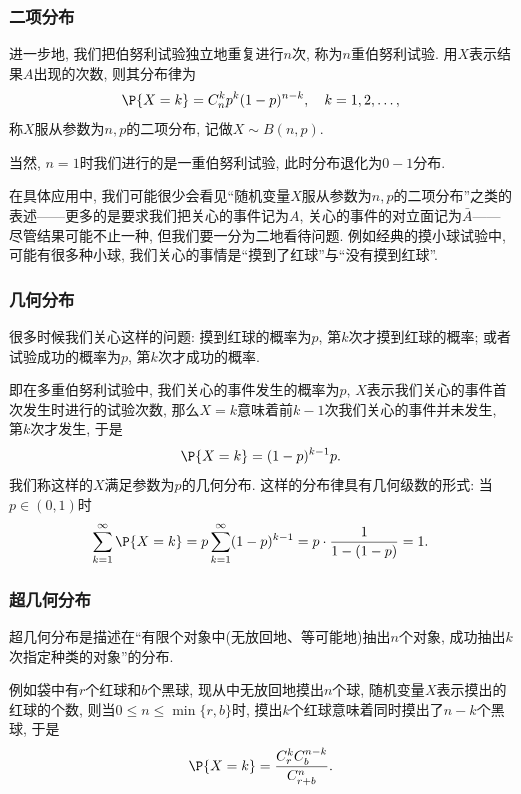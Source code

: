 \documentclass[11pt]{ctexart}
\begin{document}
\subsubsection{二项分布}

进一步地, 我们把伯努利试验{\keben 独立地重复进行$n$次}, 称为$n$重伯努利试验. 
用$X$表示结果$A$出现的次数, 则其分布律为
\begin{equation*}
	\P \{ X = k \} = C_n^k p^k (1-p)^{n-k}, \quad k = 1,2, \dots,  
\end{equation*}
称$X$服从参数为$n, p$的二项分布, 记做$X \sim B(n, p)$. 

当然, $n=1$时我们进行的是一重伯努利试验, 此时分布退化为$0-1$分布. 

\begin{remark}
	在具体应用中, 我们可能很少会看见“随机变量$X$服从参数为$n, p$的二项分布”之类的表述——更多的是要求我们把关心的事件记为$A$, 关心的事件的对立面记为$\bar A$——尽管结果可能不止一种, 但我们要一分为二地看待问题. 
	例如经典的摸小球试验中, 可能有很多种小球, 我们关心的事情是“摸到了红球”与“没有摸到红球”. 
\end{remark}

\subsubsection{几何分布}

很多时候我们关心这样的问题: 摸到红球的概率为$p$, 第$k$次才摸到红球的概率; 或者试验成功的概率为$p$, 第$k$次才成功的概率. 

即在多重伯努利试验中, 我们关心的事件发生的概率为$p$, $X$表示我们关心的事件首次发生时进行的试验次数, 那么$X = k$意味着前$k-1$次我们关心的事件并未发生, 第$k$次才发生, 于是
\begin{equation*}
	\P \{ X = k \} = (1-p)^{k-1} p. 
\end{equation*}
我们称这样的$X$满足参数为$p$的几何分布.
这样的分布律具有几何级数的形式: 当$p \in (0,1)$时
\begin{equation*}
	\sum_{k=1}^{\infty} \P\{ X = k \}
	= p \sum_{k=1}^{\infty} (1-p)^{k-1} 
	= p \cdot \frac{1}{1 - (1-p)}
	= 1. 
\end{equation*}

\subsubsection{超几何分布}
超几何分布是描述在“有限个对象中(无放回地、等可能地)抽出$n$个对象, 成功抽出$k$次指定种类的对象”的分布. 

例如袋中有$r$个红球和$b$个黑球, 现从中无放回地摸出$n$个球, 随机变量$X$表示摸出的红球的个数, 则当$0 \leq n \leq \min\{r, b\}$时, 摸出$k$个红球意味着同时摸出了$n-k$个黑球, 于是
\begin{equation*}
	\P \{X=k\} = \frac{C_r^k C_b^{n-k}}{C_{r+b}^n}. 
\end{equation*}
\end{document}
